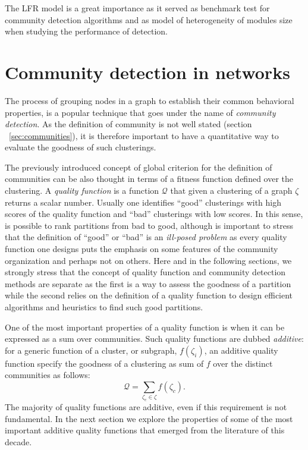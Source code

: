 The LFR model is a great importance as it served as benchmark test for community detection algorithms and as model of heterogeneity of modules size when studying the performance of detection.

\section{Community detection in networks}
\label{sec:communitydetectioninnetworks}
The process of grouping nodes in a graph to establish their common behavioral properties, is a popular technique that goes under the name of \emph{community detection}.
As the definition of community is not well stated (section ~\ref{sec:communities}), it is therefore important to have a quantitative way to evaluate the goodness of such clusterings.

The previously introduced concept of global criterion for the definition of communities can be also thought in terms of a fitness function defined over the clustering.
A \emph{quality function} is a function $\mathcal{Q}$ that given a clustering of a graph $\zeta$ returns a scalar number. Usually one identifies ``good'' clusterings with high scores of the quality function and ``bad'' clusterings with low scores. In this sense, is possible to rank partitions from bad to good, although is important to stress that the definition of ``good'' or ``bad'' is an \emph{ill-posed problem} as every quality function one designs puts the emphasis on some features of the community organization and perhaps not on others. 
Here and in the following sections, we strongly stress that the concept of quality function and community detection methods are separate as the first is a way to assess the goodness of a partition while the second relies on the definition of a quality function to design efficient algorithms and heuristics to find such good partitions.

One of the most important properties of a quality function is when it can be expressed as a sum over communities. Such quality functions are dubbed \emph{additive}: for a generic function of a cluster, or subgraph, $f(\zeta_i)$, an additive quality function specify the goodness of a clustering as sum of $f$ over the distinct communities as follows:
\begin{equation}\label{eq:additive_quality}
\mathcal{Q} = \sum \limits_{\zeta_c \in \zeta} f(\zeta_c).
\end{equation}
The majority of quality functions are additive, even if this requirement is not fundamental. In the next section we explore the properties of some of the most important additive quality functions that emerged from the literature of this decade.

